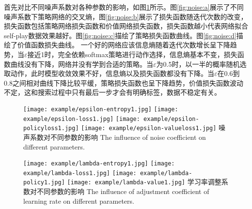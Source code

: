 首先对比不同噪声系数对各种参数的影响，如图\ref{fig:noise}所示。图\ref{fig:noise:a}展示了不同噪声系数下策略网络的交叉熵，图\ref{fig:noise:b}展示了损失函数随迭代次数的改变，损失函数包括策略网络损失函数和价值网络损失函数，损失函数越小代表网络拟合self-play数据效果越好。图\ref{fig:noise:c}描绘了策略损失函数曲线。图\ref{fig:noise:d}描绘了价值函数损失曲线。
一个好的网络应该信息熵随着迭代次数增长呈下降趋势，当$\varepsilon$接近1时，完全依赖softmax策略进行动作选择，信息熵基本不变，损失函数曲线没有下降，网络并没有学到合适的策略。当$\varepsilon$为0.5时，以一半的概率随机选取动作，此时模型收敛效果不好，信息熵以及损失函数都没有下降。当$\varepsilon$在0.6到0.8之间相对曲线下降比较平缓，策略损失函数也呈下降趋势，价值损失函数波动不定，这和搜索过程中只有最后一步才会有明确标签，数据不稳定有关。

\begin{figure}[htpb]
	\centering
	{\texttt{[image: example/epsilon-entropy1.jpg]}}
	\hspace{0.5em}
	{\texttt{[image: example/epsilon-loss1.jpg]}}
	\newline
	\centering
	{\texttt{[image: example/epsilon-policyloss1.jpg]}}
	\hspace{0.5em}
	{\texttt{[image: example/epsilon-valueloss1.jpg]}}
	\bicaption
	{噪声系数对不同参数的影响}
	{The influence of noise coefficient on different parameters.}
	\label{fig:noise}
\end{figure}

\begin{figure}[hbpt]
	\centering
	{\texttt{[image: example/lambda-entropy1.jpg]}}
	{\texttt{[image: example/lambda-loss1.jpg]}}
	\newline
	\centering
	{\texttt{[image: example/lambda-policy1.jpg]}}
	{\texttt{[image: example/lambda-value1.jpg]}}
	\bicaption
	{学习率调整系数对不同参数的影响}
	{The influence of adjustment coefficient of learning rate on different parameters.}
	\label{fig2response}
\end{figure}

